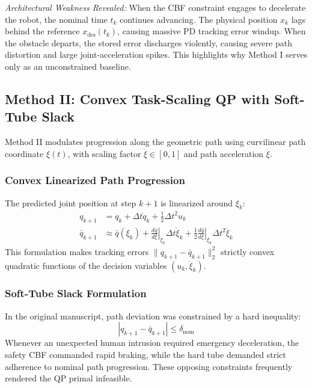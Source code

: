 \documentclass[10pt,twocolumn,a4paper]{article}
\begin{document}
\textit{Architectural Weakness Revealed:} When the CBF constraint engages to decelerate the robot, the nominal time $t_k$ continues advancing. The physical position $x_k$ lags behind the reference $x_{\text{des}}(t_k)$, causing massive PD tracking error windup. When the obstacle departs, the stored error discharges violently, causing severe path distortion and large joint-acceleration spikes. This highlights why Method I serves only as an unconstrained baseline.

\subsection{Method II: Convex Task-Scaling QP with Soft-Tube Slack}
Method II modulates progression along the geometric path using curvilinear path coordinate $\xi(t)$, with scaling factor $\dot{\xi} \in [0, 1]$ and path acceleration $\ddot{\xi}$.

\subsubsection{Convex Linearized Path Progression}
The predicted joint position at step $k+1$ is linearized around $\xi_k$:
\begin{align}
q_{k+1} &= q_k + \Delta t \dot{q}_k + \frac{1}{2}\Delta t^2 u_k \\
\bar{q}_{k+1} &\approx \bar{q}(\xi_k) + \left.\frac{d\bar{q}}{d\xi}\right|_{\xi_k} \Delta t \dot{\xi}_k + \frac{1}{2}\left.\frac{d\bar{q}}{d\xi}\right|_{\xi_k} \Delta t^2 \ddot{\xi}_k
\end{align}
This formulation makes tracking errors $\|q_{k+1} - \bar{q}_{k+1}\|_2^2$ strictly convex quadratic functions of the decision variables $(u_k, \ddot{\xi}_k)$.

\subsubsection{Soft-Tube Slack Formulation}
In the original manuscript, path deviation was constrained by a hard inequality:
\begin{equation}
|q_{k+1} - \bar{q}_{k+1}| \le \delta_{\text{nom}}
\end{equation}
Whenever an unexpected human intrusion required emergency deceleration, the safety CBF commanded rapid braking, while the hard tube demanded strict adherence to nominal path progression. These opposing constraints frequently rendered the QP primal infeasible.
\end{document}
